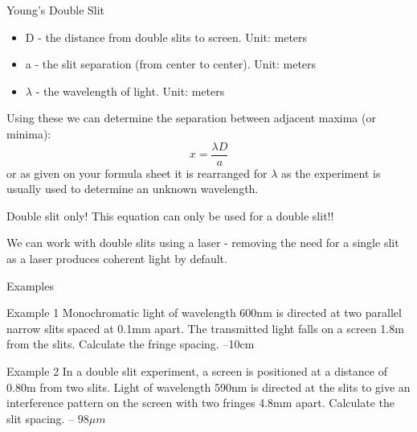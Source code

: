 \documentclass[../Main.tex]{subfiles}
\begin{document}
\begin{frame}{Young's Double Slit}
    \begin{itemize}
        \item D - the distance from double slits to screen. Unit: meters
        \item a - the slit separation (from center to center). Unit: meters
        \item $\lambda$ - the wavelength of light. Unit: meters
    \end{itemize}
    Using these we can determine the separation between adjacent maxima (or minima):
    \pause
    \begin{equation*}
        x=\frac{\lambda D}{a}
    \end{equation*} or as given on your formula sheet it is rearranged for $\lambda$ as the experiment is usually used to determine an unknown wavelength.
    
    \begin{alertblock}{Double slit only!}
This equation can only be used for a double slit!! 
    \end{alertblock}
    We can work with double slits using a laser - removing the need for a single slit as a laser produces coherent light by default. 
\end{frame}

\begin{frame}{Examples}
    \begin{exampleblock}{Example 1}
    Monochromatic light of wavelength 600nm is directed at two parallel narrow slits spaced at 0.1mm
apart. The transmitted light falls on a screen 1.8m from the slits. Calculate the fringe spacing. \pause
--10cm
    \end{exampleblock} \pause
    
    \begin{exampleblock}{Example 2}
    In a double slit experiment, a screen is positioned at a distance of 0.80m from two slits. Light of wavelength 590nm is directed at the slits to give an interference pattern on the screen with two fringes 4.8mm apart. Calculate the slit spacing. %
    -- $98\mu m$
    \end{exampleblock}
\end{frame}
\end{document}
